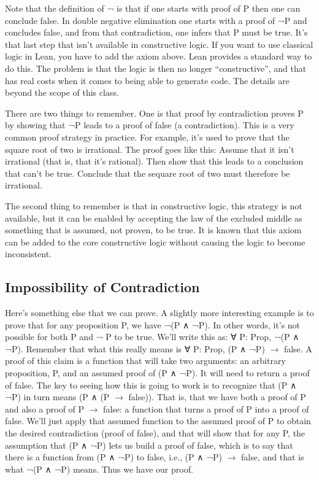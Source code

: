 \documentclass[letterpaper,10pt,english]{sphinxmanual}
\begin{document}
Note that the definition of ¬ is that if one starts with proof of P
then one can conclude false. In double negative elimination one starts
with a proof of ¬P and concludes false, and from that contradiction,
one infers that P must be true. It’s that last step that isn’t
available in constructive logic. If you want to use classical logic in
Lean, you have to add the axiom above. Lean provides a standard way to
do this.  The problem is that the logic is then no longer
“constructive”, and that has real costs when it comes to being able to
generate code. The details are beyond the scope of this class.

There are two things to remember. One is that proof by contradiction
proves P by showing that ¬P leads to a proof of false (a
contradiction). This is a very common proof strategy in practice.  For
example, it’s used to prove that the square root of two is irrational.
The proof goes like this: Assume that it isn’t irrational (that is,
that it’s rational). Then show that this leads to a conclusion that
can’t be true. Conclude that the sequare root of two must therefore be
irrational.

The second thing to remember is that in constructive logic, this
strategy is not available, but it can be enabled by accepting the law
of the excluded middle as something that is assumed, not proven, to be
true. It is known that this axiom can be added to the core
constructive logic without causing the logic to become inconsistent.


\subsection{Impossibility of Contradiction}
\label{\detokenize{15-proofs:impossibility-of-contradiction}}
Here’s something else that we can prove.  A slightly more interesting
example is to prove that for any proposition P, we have ¬(P ∧ ¬P). In
other words, it’s not possible for both P and ¬ P to be true.  We’ll
write this as: ∀ P: Prop, ¬(P ∧ ¬P).  Remember that what this really
means is ∀ P: Prop, (P ∧ ¬P) \(\rightarrow\) false. A proof of this claim is a
function that will take two arguments: an arbitrary proposition, P,
and an assumed proof of (P ∧ ¬P). It will need to return a proof of
false.  The key to seeing how this is going to work is to recognize
that (P ∧ ¬P) in turn means (P ∧ (P \(\rightarrow\) false)). That is, that we have
both a proof of P and also a proof of P \(\rightarrow\) false: a function that turns
a proof of P into a proof of false.  We’ll just apply that assumed
function to the assumed proof of P to obtain the desired contradiction
(proof of false), and that will show that for any P, the assumption
that (P ∧ ¬P) lets us build a proof of false, which is to say that
there is a function from (P ∧ ¬P) to false, i.e., (P ∧ ¬P) \(\rightarrow\) false,
and that is what ¬(P ∧ ¬P) means. Thus we have our proof.
\end{document}
